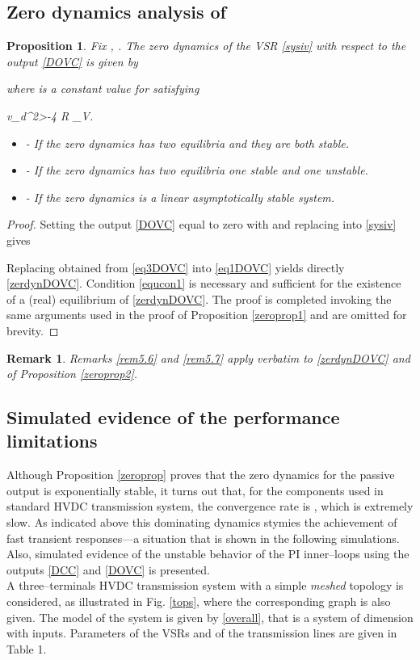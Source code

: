 \documentclass[5p,twocolumn]{elsarticle}
\def\begequ{}
\def\lab{\label}
\def\begite{\begin{itemize}}
\def\endite{\end{itemize}}
\def\begrem{\begin{remark}\rm}
\def\endrem{\end{remark}}
\newtheorem{proposition}[theorem]{Proposition}
\newtheorem{remark}[theorem]{Remark}
\numberwithin{equation}{section}
\begin{document}
\subsection{Zero dynamics analysis of }
\label{zerdyn2}


\begin{proposition}\em
\label{zeroprop2}
Fix , . The zero dynamics of the VSR \eqref{sysiv} with respect to the output \eqref{DOVC} is given by

where  is a constant value for  satisfying
\begequ
\lab{equcon1}
v_d^2>-4 R \alpha_V.
\endequ
\begite
\item[-] If  the zero dynamics has two equilibria and they are both {\em stable}.
\item[-] If  the zero dynamics has two equilibria one stable and one {unstable}.
\item[-] If  the zero dynamics is a linear asymptotically {\em stable} system.
\endite
\end{proposition}
\begin{proof}
Setting the output \eqref{DOVC} equal to zero with  and replacing into \eqref{sysiv} gives

Replacing  obtained from \eqref{eq3DOVC} into \eqref{eq1DOVC} yields directly \eqref{zerdynDOVC}. Condition \eqref{equcon1} is necessary and sufficient for the existence of a (real) equilibrium of
\eqref{zerdynDOVC}. The proof is completed invoking the same arguments used in the proof of Proposition \ref{zeroprop1} and are omitted for brevity.
\end{proof}

\begrem
Remarks \ref{rem5.6} and \ref{rem5.7} apply \textit{verbatim} to \eqref{zerdynDOVC} and  of Proposition \ref{zeroprop2}.
\endrem

\subsection{Simulated evidence of the performance limitations}
\label{simuinner}
Although Proposition \ref{zeroprop} proves that the zero dynamics for the passive output  is exponentially stable, it turns out that, for the components used in standard HVDC transmission system, the convergence rate is , which is extremely slow. As indicated above this dominating dynamics stymies the achievement of fast transient responses---a situation that is shown in the following simulations. Also, simulated evidence of the unstable behavior of the PI inner--loops using the outputs  \eqref{DCC} and \eqref{DOVC} is presented.\\
A three--terminals HVDC transmission system with a simple \textit{meshed} topology is considered, as illustrated in Fig. \ref{tops}, where the corresponding graph is also given. The model of the system is given by \eqref{overall}, that is a system of dimension  with  inputs. Parameters of the VSRs and of the transmission lines are given in Table 1.
\end{document}
